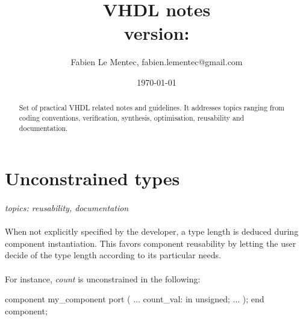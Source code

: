 \documentclass[12pt]{article}
\begin{document}
\newcommand{\note}[1]
{\newpage\section{#1}}

\newcommand{\topics}[1]
{\paragraph{}\small{\textit{topics: #1}}}

\newcommand{\todo}[1]
{\paragraph{}\textbf{TODO}: #1}

{\newline\lstset{language=VHDL, frame=single}}{}

{}{\newcommand{\version}{none}}

\title{VHDL notes\\ \small{version: \version}}
\author{Fabien Le Mentec, fabien.lementec@gmail.com}
\date{\today}


\maketitle

\begin{abstract}
Set of practical VHDL related notes and guidelines. It addresses
topics ranging from coding conventions, verification, synthesis,
optimisation, reusability and documentation.
\end{abstract}

\newpage
\setcounter{tocdepth}{1}
\tableofcontents


\note{Unconstrained types}
\topics{reusability, documentation}

\paragraph{}
When not explicitly specified by the developer, a type length
is deduced during component instantiation. This favors component
reusability by letting the user decide of the type length
according to its particular needs.

\paragraph{}
For instance, \textit{count} is unconstrained in the following:
\begin{vhdl}
component my_component
port
(
 ...
 count_val: in unsigned;
 ...
);
end component;
\end{vhdl}
\end{document}
